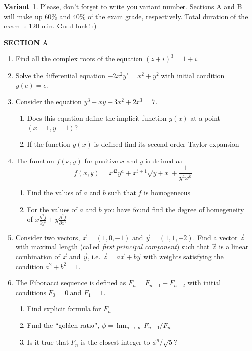 \textbf{Variant 1}. Please, don't forget to write you variant number. Sections A and B will make up 60\% and 40\% of the exam grade, respectively. Total duration of the exam is 120 min. Good luck! :)


\textbf{SECTION A}

\begin{enumerate}

\item Find all the complex roots of the equation $(z+i)^3=1+i$.

\item Solve the differential equation $-2x^2y'=x^2+y^2$ with initial condition $y(e)=e$.

\item Consider the equation $y^3+xy+3x^2+2x^3=7$.
\begin{enumerate}
\item Does this equation define the implicit function $y(x)$ at a point $(x=1,y=1)$?
\item If the function $y(x)$ is defined find its second order Taylor expansion
\end{enumerate}

\item The function $f(x,y)$ for positive $x$ and $y$ is defined as
\[
f(x,y)=x^{42}y^a + x^{b+1}\sqrt{y+x}+\frac{1}{y^a x^b}
\]

\begin{enumerate}
\item Find the values of $a$ and $b$ such that $f$ is homogeneous
\item For the values of  $a$ and $b$ you have found find the degree of homegeneity of $x\frac{\partial^2 f}{\partial y^2} +y\frac{\partial^2 f}{\partial x^2}$
\end{enumerate}

\item Consider two vectors, $\vec{x}=(1,0,-1)$ and $\vec{y}=(1,1,-2)$. Find a vector $\vec{z}$ with maximal length (called \textit{first principal component}) such that $\vec{z}$ is a linear combination of $\vec{x}$ and $\vec{y}$, i.e. $\vec{z}=a \vec{x} + b \vec{y}$ with weights satisfying the condition $a^2+b^2=1$.

\item The Fibonacci sequence is defined as $F_n=F_{n-1}+F_{n-2}$ with initial conditions $F_0=0$ and $F_1=1$.
\begin{enumerate}
\item Find explicit formula for $F_n$
\item Find the ``golden ratio'', $\phi=\lim_{n\to\infty} F_{n+1}/F_n$
\item Is it true that $F_n$ is the closest integer to $\phi^n/\sqrt{5}$?
\end{enumerate}



\end{enumerate}

